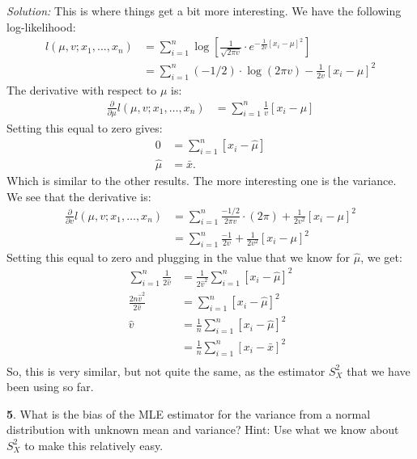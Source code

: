 \documentclass{tufte-handout}
\begin{document}
\textit{Solution:} This is where things get a bit more interesting. We have the following
log-likelihood:
\begin{align*}
l(\mu, v; x_1, \ldots, x_n) &= \sum_{i=1}^n \log\left[ \frac{1}{\sqrt{2\pi v}} \cdot e^{-\frac{1}{2v} [x_i - \mu]^2} \right]  \\
&= \sum_{i=1}^n (-1/2) \cdot \log(2\pi v) - \frac{1}{2v} [x_i - \mu]^2
\end{align*}
The derivative with respect to $\mu$ is:
\begin{align*}
\frac{\partial}{\partial \mu} l(\mu, v; x_1, \ldots, x_n)
&= \sum_{i=1}^n \frac{1}{v} [x_i - \mu]
\end{align*}
Setting this equal to zero gives:
\begin{align*}
0 &= \sum_{i=1}^n [x_i - \hat{\mu}] \\
\hat{\mu} &= \bar{x}.
\end{align*}
Which is similar to the other results. The more interesting one is the variance.
We see that the derivative is:
\begin{align*}
\frac{\partial}{\partial v} l(\mu, v; x_1, \ldots, x_n)
&= \sum_{i=1}^n \frac{-1/2}{2 \pi v} \cdot (2 \pi) + \frac{1}{2v^2} [x_i - \mu]^2 \\
&= \sum_{i=1}^n \frac{-1}{2v} + \frac{1}{2v^2} [x_i - \mu]^2
\end{align*}
Setting this equal to zero and plugging in the value that we know for $\hat{\mu}$,
we get:
\begin{align*}
\sum_{i=1}^n \frac{1}{2\hat{v}} &= \frac{1}{2\hat{v}^2} \sum_{i=1}^n [x_i - \hat{\mu}]^2 \\
\frac{2 n \hat{v}^2}{2\hat{v}} &= \sum_{i=1}^n [x_i - \hat{\mu}]^2 \\
\hat{v}&= \frac{1}{n} \sum_{i=1}^n [x_i - \hat{\mu}]^2  \\
&= \frac{1}{n} \sum_{i=1}^n [x_i - \bar{x}]^2  \\
\end{align*}
So, this is very similar, but not quite the same, as the estimator $S_X^2$ that
we have been using so far.

\textbf{5}. What is the bias of the MLE estimator for the variance from a normal distribution
with unknown mean and variance? Hint: Use what we know about $S_X^2$ to make this
relatively easy.
\end{document}

